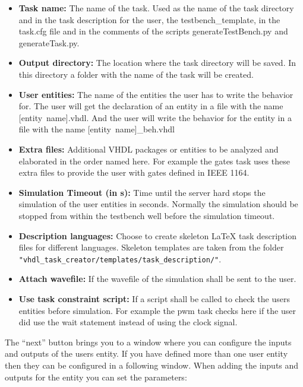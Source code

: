 \begin{itemize}
\item {\bf Task name:} The name of the task. Used as the name of the task directory and in the task description for the user, the testbench\_template, in the task.cfg file and in the comments of the scripts generateTestBench.py and generateTask.py.
\item {\bf Output directory:} The location where the task directory will be saved. In this directory a folder with the name of the task will be created.
\item {\bf User entities:} The name of the entities the user has to write the behavior for. The user will get the declaration of an entity in a file with the name \mbox{[entity name].vhdl}. And the user will write the behavior for the entity in a file with the name \mbox{[entity name]\_beh.vhdl}
\item {\bf Extra files:} Additional VHDL packages or entities to be analyzed and elaborated in the order named here. For example the gates task uses these extra files to provide the user with gates defined in IEEE 1164.
\item {\bf Simulation Timeout (in s): } Time until the server hard stops the simulation of the user entities in seconds. Normally the simulation should be stopped from within the testbench well before the simulation timeout.
\item {\bf Description languages:} Choose to create skeleton LaTeX task description files for different languages. Skeleton
templates are taken from the folder {\tt "vhdl\_task\_creator/templates/task\_description/"}.
\item {\bf Attach wavefile:} If the wavefile of the simulation shall be sent to the user.
\item {\bf Use task constraint script:} If a script shall be called to check the users entities before simulation. For example the pwm task checks here if the user did use the wait statement instead of using the clock signal.
\end{itemize}

The ``next'' button brings you to a window where you can configure the inputs and outputs of the users entity. If you have defined more than one user entity then they can be configured in a following window. When adding the inputs and outputs for the entity you can set the parameters:

